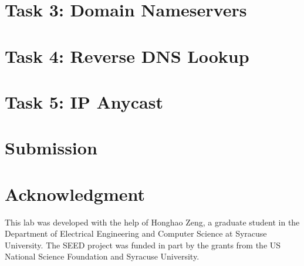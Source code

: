 \section{Task 3: Domain Nameservers} 




\section{Task 4: Reverse DNS Lookup} 




\section{Task 5: IP Anycast}










\section{Submission}





\section*{Acknowledgment} 

This lab was developed with the help of Honghao Zeng, 
a graduate student in the Department of Electrical Engineering 
and Computer Science at Syracuse University. 
The SEED project was funded in part 
by the grants from the US National Science Foundation
and Syracuse University.





